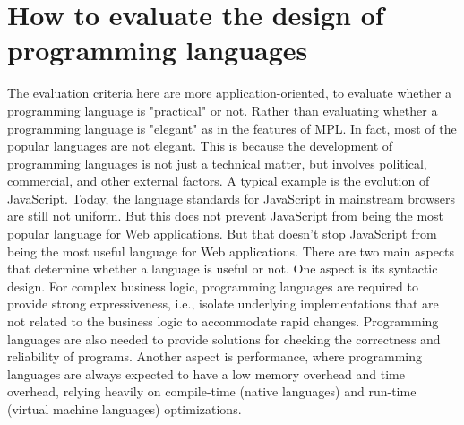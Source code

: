 \section{How to evaluate the design of programming languages}

The evaluation criteria here are more application-oriented, to evaluate whether a programming language is "practical" or not. Rather than evaluating whether a programming language is "elegant" as in the features of MPL. In fact, most of the popular languages are not elegant. This is because the development of programming languages is not just a technical matter, but involves political, commercial, and other external factors. A typical example is the evolution of JavaScript. Today, the language standards for JavaScript in mainstream browsers are still not uniform. But this does not prevent JavaScript from being the most popular language for Web applications. But that doesn't stop JavaScript from being the most useful language for Web applications. There are two main aspects that determine whether a language is useful or not. One aspect is its syntactic design. For complex business logic, programming languages are required to provide strong expressiveness, i.e., isolate underlying implementations that are not related to the business logic to accommodate rapid changes. Programming languages are also needed to provide solutions for checking the correctness and reliability of programs. Another aspect is performance, where programming languages are always expected to have a low memory overhead and time overhead, relying heavily on compile-time (native languages) and run-time (virtual machine languages) optimizations.

